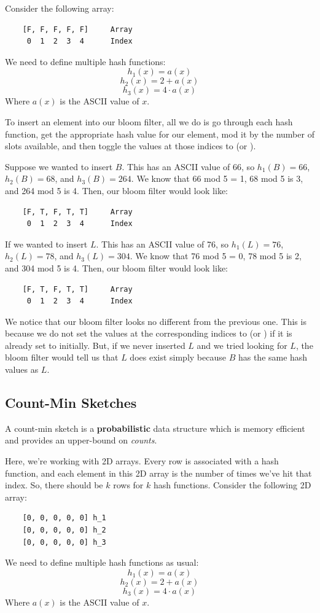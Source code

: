 \documentclass[letterpaper]{article}
\begin{document}
Consider the following array: 
\begin{verbatim}
    [F, F, F, F, F]     Array 
     0  1  2  3  4      Index
\end{verbatim}
We need to define multiple hash functions: 
\[h_{1}(x) = a(x)\]
\[h_{2}(x) = 2 + a(x)\]
\[h_{3}(x) = 4 \cdot a(x)\]
Where $a(x)$ is the ASCII value of $x$. 

\bigskip

To insert an element into our bloom filter, all we do is go through each hash function, get the appropriate hash value for our element, mod it by the number of slots available, and then toggle the values at those indices to  (or ).

\bigskip

Suppose we wanted to insert $B$. This has an ASCII value of 66, so $h_{1}(B) = 66$, $h_{2}(B) = 68$, and $h_{3}(B) = 264$. We know that 66 mod 5 = 1, 68 mod 5 is 3, and 264 mod 5 is 4. Then, our bloom filter would look like: 
\begin{verbatim}
    [F, T, F, T, T]     Array 
     0  1  2  3  4      Index
\end{verbatim}

If we wanted to insert $L$. This has an ASCII value of 76, so $h_{1}(L) = 76$, $h_{2}(L) = 78$, and $h_{3}(L) = 304$. We know that 76 mod 5 = 0, 78 mod 5 is 2, and 304 mod 5 is 4. Then, our bloom filter would look like: 
\begin{verbatim}
    [F, T, F, T, T]     Array 
     0  1  2  3  4      Index
\end{verbatim}
We notice that our bloom filter looks no different from the previous one. This is because we do not set the values at the corresponding indices to  (or ) if it is already set to  initially. But, if we never inserted $L$ and we tried looking for $L$, the bloom filter would tell us that $L$ does exist simply because $B$ has the same hash values as $L$. 

\subsection{Count-Min Sketches}
A count-min sketch is a \textbf{probabilistic} data structure which is memory efficient and provides an upper-bound on \emph{counts}.

\bigskip

Here, we're working with 2D arrays. Every row is associated with a hash function, and each element in this 2D array is the number of times we've hit that index. So, there should be $k$ rows for $k$ hash functions. Consider the following 2D array: 
\begin{verbatim}
    [0, 0, 0, 0, 0] h_1
    [0, 0, 0, 0, 0] h_2
    [0, 0, 0, 0, 0] h_3
\end{verbatim}
We need to define multiple hash functions as usual: 
\[h_{1}(x) = a(x)\]
\[h_{2}(x) = 2 + a(x)\]
\[h_{3}(x) = 4 \cdot a(x)\]
Where $a(x)$ is the ASCII value of $x$. 
\end{document}
